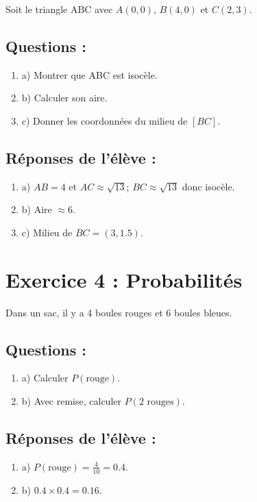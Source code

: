 \documentclass{article}
\begin{document}
Soit le triangle ABC avec $A(0,0)$, $B(4,0)$ et $C(2,3)$. 

\subsection*{Questions :}
\begin{enumerate}
    \item a) Montrer que ABC est isocèle.
    \item b) Calculer son aire.
    \item c) Donner les coordonnées du milieu de $[BC]$.
\end{enumerate}

\subsection*{Réponses de l’élève :}
\begin{enumerate}
    \item a) $AB = 4$ et $AC \approx \sqrt{13}$; $BC \approx \sqrt{13}$ donc isocèle.
    \item b) Aire $\approx 6$.
    \item c) Milieu de $BC = (3, 1.5)$.
\end{enumerate}

\section*{Exercice 4 : Probabilités}

Dans un sac, il y a 4 boules rouges et 6 boules bleues. 

\subsection*{Questions :}
\begin{enumerate}
    \item a) Calculer $P(\text{rouge})$.
    \item b) Avec remise, calculer $P(2 \text{ rouges})$.
\end{enumerate}

\subsection*{Réponses de l’élève :}
\begin{enumerate}
    \item a) $P(\text{rouge}) = \frac{4}{10} = 0.4$.
    \item b) $0.4 \times 0.4 = 0.16$.
\end{enumerate}
\end{document}
